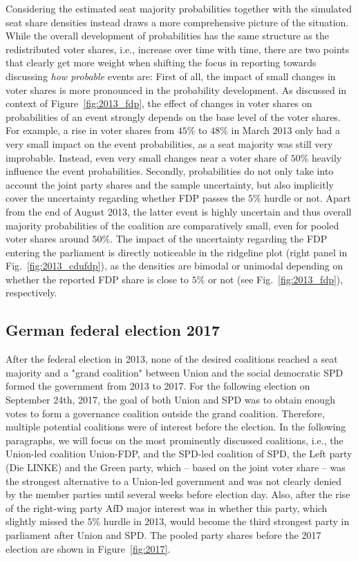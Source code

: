 \documentclass[smallcondensed]{svjour3}     %
\begin{document}
Considering the estimated seat majority probabilities together with
the simulated seat share densities instead draws a more comprehensive picture
of the situation.
While the overall development of probabilities has the same structure
as the redistributed voter shares, i.e., increase over time with time,
there are two points that clearly get more weight when shifting
the focus in reporting towards discussing {\it how probable} events are:
First of all, the impact of small changes in voter shares is more pronounced
in the probability development. As discussed in context of
Figure~\ref{fig:2013_fdp}, the effect of changes in voter shares on
probabilities of an event strongly depends on the base level of the voter shares.
For example, a rise in voter shares from $45\%$ to $48\%$ in March 2013 only had a
very small impact on the event probabilities, as a seat majority was still very improbable.
Instead, even very small changes near a voter share of $50\%$ heavily influence
the event probabilities. Secondly, probabilities do not only take into account
the joint party shares and the sample uncertainty,
but also implicitly cover the uncertainty regarding whether FDP passes the $5\%$
hurdle or not. Apart from the end of August 2013, the latter event
is highly uncertain and thus overall majority probabilities of
the coalition are comparatively small, even for pooled voter shares around $50\%$.
The impact of the uncertainty regarding the FDP entering the parliament is
directly noticeable in the ridgeline plot (right panel in Fig.~\ref{fig:2013_cdufdp}),
as the densities are bimodal or unimodal depending on whether the reported FDP
share is close to $5\%$ or not (see Fig.~\ref{fig:2013_fdp}), respectively.



\subsection{German federal election 2017} \label{subsec:2017}
After the federal election in 2013, none of the desired coalitions
reached a seat majority and a "grand coalition" between Union and the social
democratic SPD formed the government from 2013 to 2017.
For the following election on September 24th, 2017, the goal of both Union and SPD
was to obtain enough votes to form a governance coalition outside the grand
coalition. Therefore, multiple potential coalitions were of interest before the
election. In the following paragraphs, we will focus on the most prominently
discussed coalitions, i.e., the Union-led coalition Union-FDP, and the
SPD-led coalition of SPD, the Left party (Die LINKE) and the Green party, which
-- based on the joint voter share -- was the strongest alternative to a Union-led
government and was not clearly denied by the member parties until several weeks
before election day.
Also, after the rise of the right-wing party AfD major interest was
in whether this party, which slightly missed the $5\%$ hurdle in 2013,
would become the third strongest party in parliament after Union and SPD.
The pooled party shares before the 2017 election are shown in Figure~\ref{fig:2017}.
\end{document}

